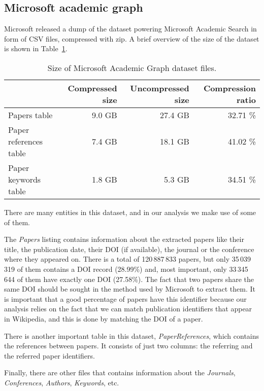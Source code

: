\subsection{Microsoft academic graph}
\label{sec:mag_dataset}
Microsoft released a dump of the dataset powering Microsoft Academic Search in form of CSV files, compressed with zip.
A brief overview of the size of the dataset is shown in Table~\ref{tbl:mag_size}.

\begin{table}[t]
\centering
\caption{Size of Microsoft Academic Graph dataset files.}
\label{tbl:mag_size}
\begin{tabular}{@{}lrrr@{}}
\toprule
\multicolumn{1}{c}{\textbf{}} & \textbf{Compressed size} & \textbf{Uncompressed size} & \textbf{Compression ratio} \\ \midrule
Papers table                &      9.0 GB &    27.4 GB & 32.71 \% \\
Paper references table      &      7.4 GB &    18.1 GB & 41.02 \% \\
Paper keywords table        &      1.8 GB &     5.3 GB & 34.51 \% \\
\bottomrule
\end{tabular}
\end{table}

There are many entities in this dataset, and in our analysis we make use of some of them.

The \emph{Papers} listing contains information about the extracted papers like their title, the publication date, their \ac{DOI} (if available), the journal or the conference where they appeared on.
There is a total of 120\,887\,833 papers, but only 35\,039\,319 of them contains a \ac{DOI} record (28.99\%) and, most important, only 33\,345\,644 of them have exactly one \ac{DOI} (27.58\%).
The fact that two papers share the same \ac{DOI} should be sought in the method used by Microsoft to extract them.
It is important that a good percentage of papers have this identifier because our analysis relies on the fact that we can match publication identifiers that appear in Wikipedia, and this is done by matching the \ac{DOI} of a paper.

There is another important table in this dataset, \emph{PaperReferences}, which contains the references between papers.
It consists of just two columns: the referring and the referred paper identifiers.

Finally, there are other files that contains information about the \emph{Journals}, \emph{Conferences}, \emph{Authors}, \emph{Keywords}, etc.

